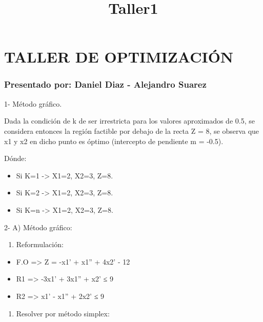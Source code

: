 \documentclass[11pt]{article}
\title{Taller1}
\providecommand{\tightlist}{%
      \setlength{\itemsep}{0pt}\setlength{\parskip}{0pt}}
\begin{document}
    
    
    \maketitle
    
    

    
    \section{TALLER DE OPTIMIZACIÓN}\label{taller-de-optimizaciuxf3n}

\subsubsection{Presentado por: Daniel Diaz - Alejandro
Suarez}\label{presentado-por-daniel-diaz---alejandro-suarez}

    1- Método gráfico.

Dada la condición de k de ser irrestricta para los valores aproximados
de 0.5, se considera entonces la región factible por debajo de la recta
Z = 8, se observa que x1 y x2 en dicho punto es óptimo (intercepto de
pendiente m = -0.5).

Dónde:

\begin{itemize}
\tightlist
\item
  Si K=1 -\textgreater{} X1=2, X2=3, Z=8.
\item
  Si K=2 -\textgreater{} X1=2, X2=3, Z=8.
\item
  Si K=n -\textgreater{} X1=2, X2=3, Z=8.
\end{itemize}

    2- A) Método gráfico:

\begin{enumerate}
\def\labelenumi{\Alph{enumi})}
\setcounter{enumi}{1}
\tightlist
\item
  Reformulación:
\end{enumerate}

\begin{itemize}
\tightlist
\item
  F.O =\textgreater{} Z = -x1' + x1'' + 4x2' - 12
\item
  R1 =\textgreater{} -3x1' + 3x1'' + x2' ≤ 9
\item
  R2 =\textgreater{} x1' - x1'' + 2x2' ≤ 9
\end{itemize}

\begin{enumerate}
\def\labelenumi{\Alph{enumi})}
\setcounter{enumi}{2}
\tightlist
\item
  Resolver por método simplex:
\end{enumerate}
\end{document}
